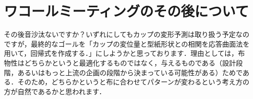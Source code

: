 \documentclass[11pt]{jsarticle}
\begin{document}
		\section{ワコールミーティングのその後について}
			その後音沙汰ないですか？いずれにしてもカップの変形予測は取り扱う予定なのですが，最終的なゴールを「カップの変位量と型紙形状との相関を応答曲面法を用いて，回帰式を作成する．」にしようかと思っております．理由としては，布物性はどちらかというと最適化するものではなく，与えるものである（設計段階，あるいはもっと上流の企画の段階から決まっている可能性がある）ためである．そのため，どちらかというと布に合わせてパターンが変わるという考え方の方が自然であるかと思われます．
		
		
	\newpage
\vspace{10cm}

\vspace{14cm}
	\articleSPRfour
	\articleSPRfive
\end{document}
